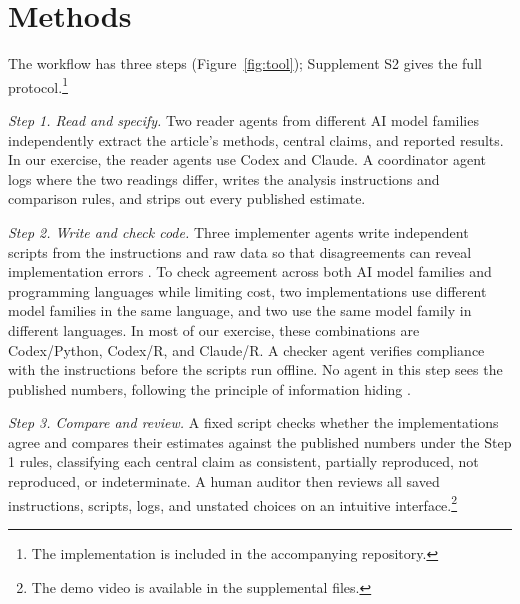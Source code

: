 \documentclass[12pt]{article}
\begin{document}
\section{Methods}\label{sec:methods}
The workflow has three steps (Figure~\ref{fig:tool}); Supplement S2 gives the full protocol.\footnote{The implementation is included in the accompanying repository.}

\textit{Step 1. Read and specify.} Two reader agents from different AI model families independently extract the article's methods, central claims, and reported results. In our exercise, the reader agents use Codex and Claude. A coordinator agent logs where the two readings differ, writes the analysis instructions and comparison rules, and strips out every published estimate.

\textit{Step 2. Write and check code.} Three implementer agents write independent scripts from the instructions and raw data so that disagreements can reveal implementation errors \citep{sah1986,csaszar2012}. To check agreement across both AI model families and programming languages while limiting cost, two implementations use different model families in the same language, and two use the same model family in different languages. In most of our exercise, these combinations are Codex/Python, Codex/R, and Claude/R. A checker agent verifies compliance with the instructions before the scripts run offline. No agent in this step sees the published numbers, following the principle of information hiding \citep{baldwin2000}.

\textit{Step 3. Compare and review.} A fixed script checks whether the implementations agree and compares their estimates against the published numbers under the Step 1 rules, classifying each central claim as consistent, partially reproduced, not reproduced, or indeterminate. A human auditor then reviews all saved instructions, scripts, logs, and unstated choices on an intuitive interface.\footnote{The demo video is available in the supplemental files.}
\end{document}
